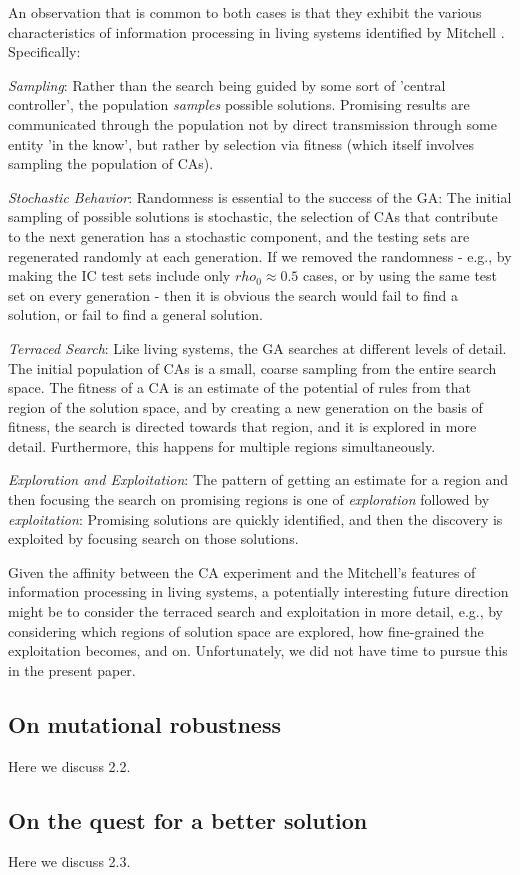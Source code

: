 An observation that is common to both cases is that they exhibit the various characteristics of information processing in living systems identified 
by Mitchell \cite{mitchell_complexity:_2009}. Specifically:
\begin{enumerate*}
	\item \textit{Sampling}: Rather than the search being guided by some sort of 'central controller', the population \textit{samples} possible 
	solutions. Promising results are communicated through the population not by direct transmission through some entity 'in the know', but rather 
	by selection via fitness (which itself involves sampling the population of CAs).
	\item \textit{Stochastic Behavior}: Randomness is essential to the success of the GA: The initial sampling of possible solutions is stochastic, the 
	selection of CAs that contribute to the next generation has a stochastic component, and the testing sets are regenerated randomly at each 
	generation. If we removed the randomness - e.g., by making the IC test sets include only $rho_0 \approx 0.5$ cases, or by using the 
	same test set on every generation - then it is obvious the search would fail to find a solution, or fail to find a general solution. 
	\item \textit{Terraced Search}: Like living systems, the GA searches at different levels of detail. The initial population of CAs is a small, 
	coarse sampling from the entire search space. The fitness of a CA is an estimate of the potential of rules from that region of the solution space, 
	and by creating a new generation on the basis of fitness, the search is directed towards that region, and it is explored in more detail. Furthermore, 
	this happens for multiple regions simultaneously.
	\item \textit{Exploration and Exploitation}: The pattern of getting an estimate for a region and then focusing the search on promising regions 
	is one of \textit{exploration} followed by \textit{exploitation}: Promising solutions are quickly identified, and then the discovery is 
	exploited by focusing search on those solutions.
\end{enumerate*}
Given the affinity between the CA experiment and the Mitchell's features of information processing in living systems, a potentially interesting future 
direction might be to consider the terraced search and exploitation in more detail, e.g., by considering which regions of solution space are explored, 
how fine-grained the exploitation becomes, and on. Unfortunately, we did not have time to pursue this in the present paper.

\subsection{On mutational robustness}

Here we discuss 2.2.

\subsection{On the quest for a better solution}

Here we discuss 2.3.


